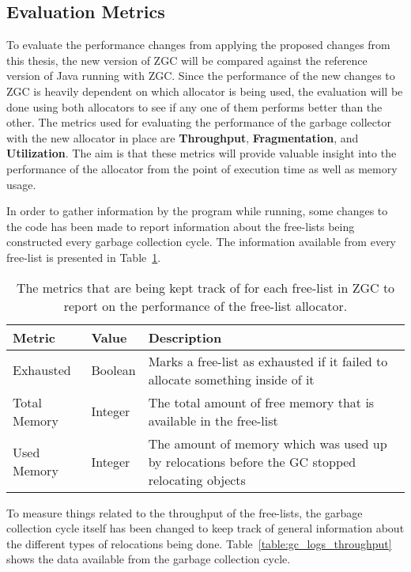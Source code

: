 \subsection{Evaluation Metrics}
To evaluate the performance changes from applying the proposed changes from this thesis, the new version of ZGC will be compared against the reference version of Java running with ZGC. Since the performance of the new changes to ZGC is heavily dependent on which allocator is being used, the evaluation will be done using both allocators to see if any one of them performs better than the other. The metrics used for evaluating the performance of the garbage collector with the new allocator in place are \textbf{Throughput}, \textbf{Fragmentation}, and \textbf{Utilization}. The aim is that these metrics will provide valuable insight into the performance of the allocator from the point of execution time as well as memory usage.

In order to gather information by the program while running, some changes to the code has been made to report information about the free-lists being constructed every garbage collection cycle. The information available from every free-list is presented in Table~\ref{table:gc_logs_fl}.

\begin{table}[H]
  \centering
  \begin{tabular}{|l|l|p{8cm}|}
    \hline
    Metric & Value & Description \\ \hline
    Exhausted & Boolean & Marks a free-list as exhausted if it failed to allocate something inside of it \\ \hline
    Total Memory & Integer & The total amount of free memory that is available in the free-list \\ \hline
    Used Memory & Integer & The amount of memory which was used up by relocations before the GC stopped relocating objects \\ \hline
  \end{tabular}
  \caption{The metrics that are being kept track of for each free-list in ZGC to report on the performance of the free-list allocator.}
  \label{table:gc_logs_fl}
\end{table}

To measure things related to the throughput of the free-lists, the garbage collection cycle itself has been changed to keep track of general information about the different types of relocations being done. Table~\ref{table:gc_logs_throughput} shows the data available from the garbage collection cycle.

